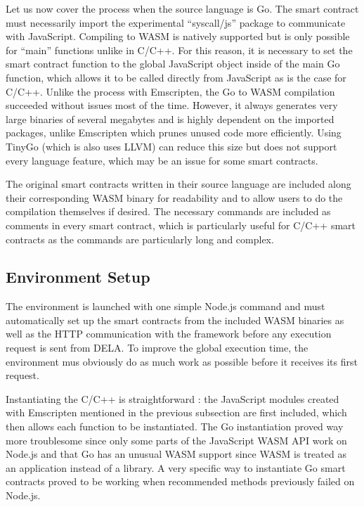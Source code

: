 \documentclass[11pt, a4paper, twoside, openright]{article}
\begin{document}
Let us now cover the process when the source language is Go. The smart contract must necessarily import the experimental ``syscall/js'' package to communicate with JavaScript. Compiling to WASM is natively supported but is only possible for ``main'' functions unlike in C/C++. For this reason, it is necessary to set the smart contract function to the global JavaScript object inside of the main Go function, which allows it to be called directly from JavaScript as is the case for C/C++. Unlike the process with Emscripten, the Go to WASM compilation succeeded without issues most of the time. However, it always generates very large binaries of several megabytes and is highly dependent on the imported packages, unlike Emscripten which prunes unused code more efficiently. Using TinyGo \cite{tinygo} (which is also uses LLVM) can reduce this size but does not support every language feature, which may be an issue for some smart contracts.

The original smart contracts written in their source language are included along their corresponding WASM binary for readability and to allow users to do the compilation themselves if desired. The necessary commands are included as comments in every smart contract, which is particularly useful for C/C++ smart contracts as the commands are particularly long and complex.

\subsection{Environment Setup}

The environment is launched with one simple Node.js command and must automatically set up the smart contracts from the included WASM binaries as well as the HTTP communication with the framework before any execution request is sent from DELA. To improve the global execution time, the environment mus obviously do as much work as possible before it receives its first request.

Instantiating the C/C++ is straightforward : the JavaScript modules created with Emscripten mentioned in the previous subsection are first included, which then allows each function to be instantiated. The Go instantiation proved way more troublesome since only some parts of the JavaScript WASM API work on Node.js and that Go has an unusual WASM support since WASM is treated as an application instead of a library. A very specific way to instantiate Go smart contracts proved to be working when recommended methods previously failed on Node.js. 
\end{document}
